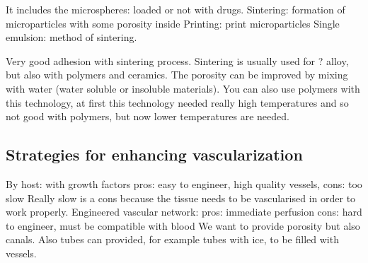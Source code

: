 It includes the microspheres: loaded or not with drugs.
Sintering: formation of microparticles with some porosity inside
Printing: print microparticles Single emulsion: method of sintering.

Very good adhesion with sintering process. Sintering is usually used for ? alloy, but also with polymers and ceramics.
The porosity can be improved by mixing with water (water soluble or insoluble materials).
You can also use polymers with this technology, at first this technology needed really high temperatures and so not good with polymers, but now lower temperatures are needed.

\subsection{Strategies for enhancing vascularization}
By host: with growth factors pros: easy to engineer, high quality vessels, cons: too slow
Really slow is a cons because the tissue needs to be vascularised in order to work properly.
Engineered vascular network:
pros: immediate perfusion
cons: hard to engineer, must be compatible with blood We want to provide porosity but also canals.
Also tubes can provided, for example tubes with ice, to be filled with vessels.



